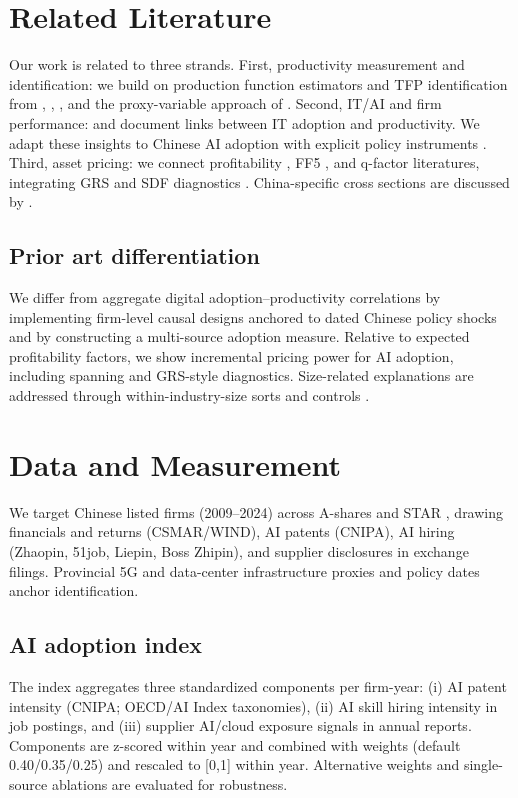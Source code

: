 \section{Related Literature}
Our work is related to three strands. First, productivity measurement and identification: we build on production function estimators and TFP identification from \citet{OlleyPakes1996}, \citet{LevinsohnPetrin2003}, \citet{AckerbergCavesFrazer2015}, and the proxy-variable approach of \citet{Wooldridge2009}. Second, IT/AI and firm performance: \citet{BrynjolfssonHitt2000} and \citet{Bloom2012} document links between IT adoption and productivity. We adapt these insights to Chinese AI adoption with explicit policy instruments \citep{StateCouncil2017, CAC2023, MIIT2022}. Third, asset pricing: we connect profitability \citep{NovyMarx2013}, FF5 \citep{FamaFrench2015}, and q-factor \citep{HouXueZhang2015} literatures, integrating GRS \citep{GRS1989} and SDF diagnostics \citep{HansenJagannathan1997}. China-specific cross sections are discussed by \citet{LiuStambaughYuan2019}.

\subsection*{Prior art differentiation}
We differ from aggregate digital adoption–productivity correlations by implementing firm-level causal designs anchored to dated Chinese policy shocks and by constructing a multi-source adoption measure. Relative to expected profitability factors, we show incremental pricing power for AI adoption, including spanning and GRS-style diagnostics. Size-related explanations are addressed through within-industry-size sorts and controls \citep{LiuStambaughYuan2019}.

\section{Data and Measurement}
We target Chinese listed firms (2009–2024) across A-shares and STAR \citep{SSESTAR2020}, drawing financials and returns (CSMAR/WIND), AI patents (CNIPA), AI hiring (Zhaopin, 51job, Liepin, Boss Zhipin), and supplier disclosures in exchange filings. Provincial 5G and data-center infrastructure proxies \citep{MIIT2022} and policy dates \citep{StateCouncil2017, CAC2023} anchor identification.

\subsection{AI adoption index}
The index aggregates three standardized components per firm-year: (i) AI patent intensity (CNIPA; OECD/AI Index taxonomies), (ii) AI skill hiring intensity in job postings, and (iii) supplier AI/cloud exposure signals in annual reports. Components are z-scored within year and combined with weights (default 0.40/0.35/0.25) and rescaled to [0,1] within year. Alternative weights and single-source ablations are evaluated for robustness.


